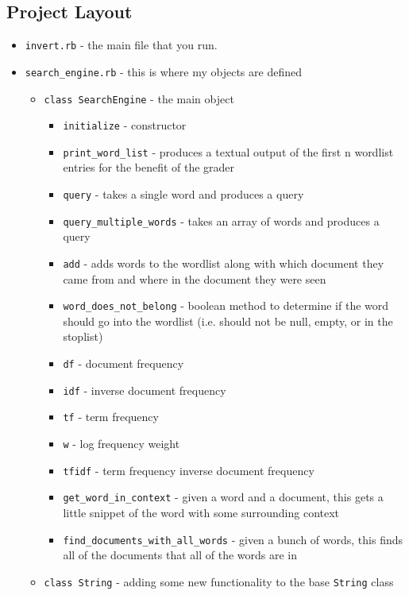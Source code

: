 \documentclass[12pt]{article}
\begin{document}
\subsection{Project Layout} %
\label{sub:project_layout}
\begin{itemize}
  \item \texttt{invert.rb} - the main file that you run.
  \item \texttt{search\_engine.rb} - this is where my objects are defined
    \begin{itemize}
      \item \texttt{class SearchEngine} - the main object
      \begin{itemize}
        \item \texttt{initialize} - constructor
        \item \texttt{print\_word\_list} - produces a textual output of the first n wordlist entries for the benefit of the grader
        \item \texttt{query} - takes a single word and produces a query
        \item \texttt{query\_multiple\_words} - takes an array of words and produces a query
        \item \texttt{add} - adds words to the wordlist along with which document they came from and where in the document they were seen
        \item \texttt{word\_does\_not\_belong} - boolean method to determine if the word should go into the wordlist (i.e. should not be null, empty, or in the stoplist)
        \item \texttt{df} - document frequency
        \item \texttt{idf} - inverse document frequency
        \item \texttt{tf} - term frequency
        \item \texttt{w} - log frequency weight
        \item \texttt{tfidf} - term frequency inverse document frequency
        \item \texttt{get\_word\_in\_context} - given a word and a document, this gets a little snippet of the word with some surrounding context
        \item \texttt{find\_documents\_with\_all\_words} - given a bunch of words, this finds all of the documents that all of the words are in
      \end{itemize}
      \item \texttt{class String} - adding some new functionality to the base \texttt{String} class

\end{itemize}
\end{itemize}
\end{document}

